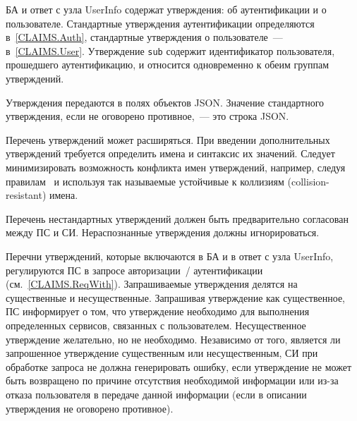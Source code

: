 \label{CLAIMS.General}

БА и ответ с узла UserInfo содержат утверждения: об аутентификации и о 
пользователе. Стандартные утверждения аутентификации определяются в~\ref{CLAIMS.Auth}, 
стандартные утверждения о пользователе~--- в~\ref{CLAIMS.User}. 
%
Утверждение \lstinline{sub} содержит идентификатор пользователя, прошедшего 
аутентификацию, и относится одновременно к обеим группам утверждений.

Утверждения передаются в полях объектов JSON. Значение стандартного 
утверждения, если не оговорено противное,~--- это строка JSON.

Перечень утверждений может расширяться. При введении дополнительных утверждений 
требуется определить имена и синтаксис их значений. 
%
Следует минимизировать возможность конфликта имен утверждений, например, 
следуя правилам~\cite{RFC7519} и используя так называемые 
устойчивые к коллизиям (collision-resistant) имена. 

Перечень нестандартных утверждений должен быть предварительно согласован между
ПС и СИ. Нераспознанные утверждения должны игнорироваться.

Перечни утверждений, которые включаются в БА и в ответ с узла UserInfo, 
регулируются ПС в запросе авторизации~/ аутентификации (см.~\ref{CLAIMS.ReqWith}).
%
Запрашиваемые утверждения делятся на существенные и несущественные.
%
Запрашивая утверждение как существенное, ПС информирует о том, что 
утверждение необходимо для выполнения определенных сервисов, связанных с 
пользователем.
%
Несущественное утверждение желательно, но не необходимо.
%
Независимо от того, является ли запрошенное утверждение существенным или 
несущественным, СИ при обработке запроса не должна генерировать ошибку, если 
утверждение не может быть возвращено по причине отсутствия необходимой 
информации или из-за отказа пользователя в передаче данной информации 
(если в описании утверждения не оговорено противное).

